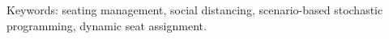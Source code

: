 Keywords: seating management, social distancing, scenario-based stochastic programming, dynamic seat assignment.




